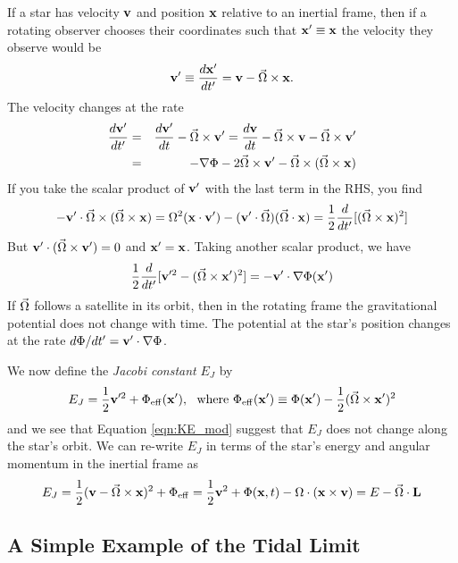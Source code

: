 \documentclass[]{article}
\begin{document}
If a star has velocity $\mathbf{v}$ and position $\mathbf{x}$ relative to an inertial
frame, then if a rotating observer chooses their coordinates such that
$\mathbf{x}'\equiv\mathbf{x}$ the velocity they observe would be
\begin{equation}
\mathbf{v}' \equiv \frac{d\mathbf{x}'}{dt'} = \mathbf{v} - \vec{\Omega} \times \mathbf{x}.
\end{equation}
\noindent
The velocity changes at the rate
\begin{eqnarray}
\frac{d\mathbf{v}'}{dt'} &=& \frac{d\mathbf{v}'}{dt} - \vec{\Omega} \times \mathbf{v}' = \frac{d\mathbf{v}}{dt} - \vec{\Omega} \times \mathbf{v} - \vec{\Omega} \times \mathbf{v}'\nonumber\\
&=& - \nabla \Phi - 2 \vec{\Omega} \times \mathbf{v}' - \vec{\Omega}\times(\vec{\Omega} \times \mathbf{x})
\end{eqnarray}
\noindent
If you take the scalar product of $\mathbf{v}'$ with the last term in the RHS, you find
\begin{equation}
-\mathbf{v}'\cdot\vec{\Omega}\times(\vec{\Omega} \times \mathbf{x}) = \Omega^2(\mathbf{x}\cdot\mathbf{v}') - (\mathbf{v}'\cdot\vec{\Omega})(\vec{\Omega}\cdot\mathbf{x}) = \frac{1}{2}\frac{d}{dt'}[(\vec{\Omega}\times\mathbf{x})^2]
\end{equation}
\noindent
But $\mathbf{v}'\cdot(\vec{\Omega}\times\mathbf{v}')=0$ and $\mathbf{x}'=\mathbf{x}$.  Taking another scalar product, we have
\begin{equation}
\label{eqn:KE_mod}
\frac{1}{2}\frac{d}{dt'}[\mathbf{v}'^2 - (\vec{\Omega} \times \mathbf{x}')^2] = -\mathbf{v}' \cdot \nabla\Phi(\mathbf{x}')
\end{equation}
If $\vec{\Omega}$ follows a satellite in its orbit, then in the rotating frame the gravitational
potential does not change with time. The potential at the star's position
changes at the rate $d\Phi/dt' = \mathbf{v}'\cdot\nabla\Phi$.

We now define the {\it Jacobi constant} $E_J$ by
\begin{equation}
E_J = \frac{1}{2}\mathbf{v}'^2 + \Phi_\mathrm{eff}(\mathbf{x}'),~~\mathrm{where}~\Phi_\mathrm{eff}(\mathbf{x}')\equiv\Phi(\mathbf{x}') - \frac{1}{2}(\vec{\Omega}\times\mathbf{x}')^2
\end{equation}
\noindent
and we see that Equation \ref{eqn:KE_mod} suggest that $E_J$ does not change along the star's orbit.
We can re-write $E_J$ in terms of the star's energy and angular momentum in the inertial frame as
\begin{equation}
E_J = \frac{1}{2}(\mathbf{v}-\vec{\Omega}\times\mathbf{x})^2 + \Phi_\mathrm{eff} = \frac{1}{2}\mathbf{v}^2 + \Phi(\mathbf{x},t) - \Omega\cdot(\mathbf{x}\times\mathbf{v}) = E - \vec{\Omega}\cdot\mathbf{L}
\end{equation}

\subsection{A Simple Example of the Tidal Limit}
\end{document}
